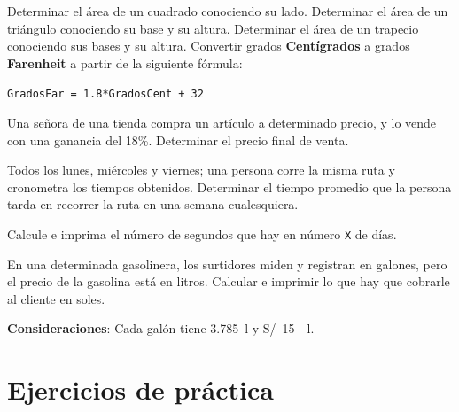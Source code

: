 \documentclass[spanish,addpoints,answers,a4paper]{exam}
\begin{document}
\begin{questions}

\question Determinar el área de un cuadrado conociendo su lado.
\question Determinar el área de un triángulo conociendo su base y su altura.
\question Determinar el área de un trapecio conociendo sus bases y su altura.
\question Convertir grados \textbf{Centígrados} a grados \textbf{Farenheit} a partir de la siguiente fórmula:

{\centering \texttt{GradosFar = 1.8*GradosCent + 32}\par}

\begin{solution}

\end{solution}

\question Una señora de una tienda compra un artículo a determinado precio, y lo vende con una ganancia del 18\%. Determinar el precio final de venta.

\begin{solution}

\end{solution}

\question Todos los lunes, miércoles y viernes; una persona corre la misma ruta y cronometra los tiempos obtenidos. Determinar el tiempo promedio que la persona tarda en recorrer la ruta en una semana cualesquiera.

\begin{solution}

\end{solution}

\question Calcule e imprima el número de segundos que hay en número \texttt{X} de días.

\begin{solution}

\end{solution}

\question En una determinada gasolinera, los surtidores miden y registran en galones, pero el precio de la gasolina está en litros. Calcular e imprimir lo que hay que cobrarle al cliente en soles.

\textbf{Consideraciones}: Cada galón tiene \SI{3.785}{\litre} y \SI[per-mode=symbol]{15}[S/]{\per\litre}.

\end{questions}

\section*{Ejercicios de práctica}
\end{document}
